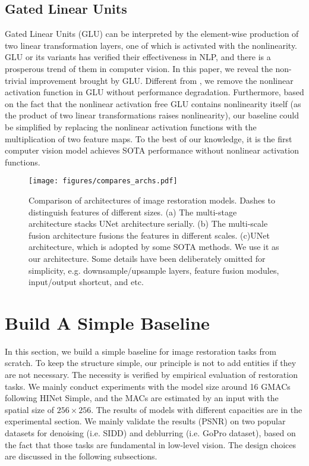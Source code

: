 \documentclass[runningheads]{llncs}
\begin{document}
\subsection{Gated Linear Units}
Gated Linear Units\cite{dauphin2017language} (GLU) can be interpreted by the element-wise production of two linear transformation layers, one of which is activated with the nonlinearity. GLU or its variants has verified their effectiveness in NLP\cite{shazeer2020glu,dauphin2017language,dai2019transformer}, and there is a prosperous trend of them in computer vision\cite{tu2022maxim,zamir2021restormer,hua2022transformer,liang2022vrt}. 
In this paper, we reveal the non-trivial improvement brought by GLU. Different from \cite{shazeer2020glu}, we remove the nonlinear activation function in GLU without performance degradation.
Furthermore, based on the fact that the nonlinear activation free GLU contains nonlinearity itself (as the product of two linear transformations raises nonlinearity), our baseline could be simplified by replacing the nonlinear activation functions with the multiplication of two feature maps. To the best of our knowledge, it is the first computer vision model achieves SOTA performance without nonlinear activation functions. 



\begin{figure*}[!t]
\texttt{[image: figures/compares\_archs.pdf]}
\caption{Comparison of architectures of image restoration models. Dashes to distinguish features of different sizes. (a) The multi-stage architecture\cite{chen2021hinet,waqas2021multi} stacks UNet architecture serially. (b) The multi-scale fusion architecture\cite{mao2021deep,cho2021rethinking} fusions the features in different scales. (c)UNet architecture, which is adopted by some SOTA methods\cite{zamir2021restormer,wang2021uformer}. We use it as our architecture. Some details have been deliberately omitted for simplicity, e.g. downsample/upsample layers, feature fusion modules, input/output shortcut, and etc. }
\label{fig:compares-archs}
\end{figure*}



\section{Build A Simple Baseline}
In this section, we build a simple baseline for image restoration tasks from scratch.  To keep the structure simple, our principle is not to add entities if they are not necessary. The necessity is verified by empirical evaluation of restoration tasks.
We mainly conduct experiments with the model size around 16 GMACs following HINet Simple\cite{chen2021hinet}, and the MACs are estimated by an input with the spatial size of $256\times 256$. The results of models with different capacities are in the experimental section. We mainly validate the results (PSNR) on two popular datasets for denoising (i.e. SIDD\cite{SIDD_2018_CVPR}) and deblurring (i.e. GoPro\cite{nah2017deep} dataset), based on the fact that those tasks are fundamental in low-level vision. The design choices are discussed in the following subsections.
\end{document}
